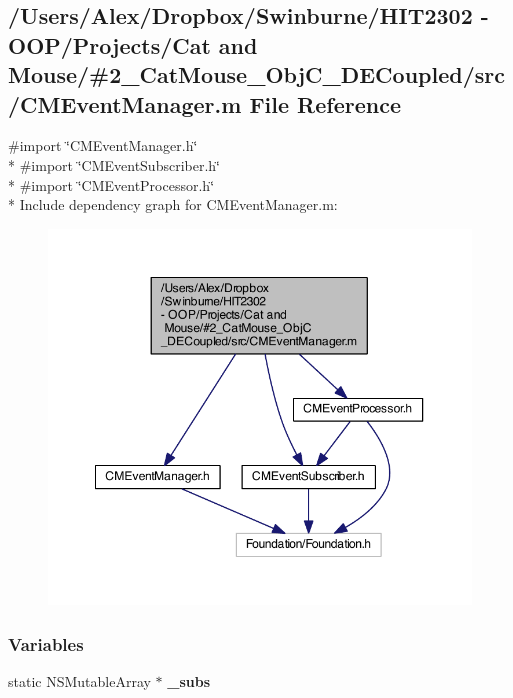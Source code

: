 \subsection{/\-Users/\-Alex/\-Dropbox/\-Swinburne/\-H\-I\-T2302 -\/ O\-O\-P/\-Projects/\-Cat and Mouse/\#2\-\_\-\-Cat\-Mouse\-\_\-\-Obj\-C\-\_\-\-D\-E\-Coupled/src/\-C\-M\-Event\-Manager.m File Reference}
\label{_c_m_event_manager_8m}
{\ttfamily \#import \char`\"{}C\-M\-Event\-Manager.\-h\char`\"{}}\\*
{\ttfamily \#import \char`\"{}C\-M\-Event\-Subscriber.\-h\char`\"{}}\\*
{\ttfamily \#import \char`\"{}C\-M\-Event\-Processor.\-h\char`\"{}}\\*
Include dependency graph for C\-M\-Event\-Manager.\-m\-:
\nopagebreak
\begin{figure}[H]
\begin{center}
\leavevmode
\includegraphics[width=350pt]{_c_m_event_manager_8m__incl}
\end{center}
\end{figure}
\subsubsection*{Variables}
\begin{DoxyCompactItemize}
\item 
static N\-S\-Mutable\-Array $\ast$ {\bf \-\_\-subs}
\end{DoxyCompactItemize}


